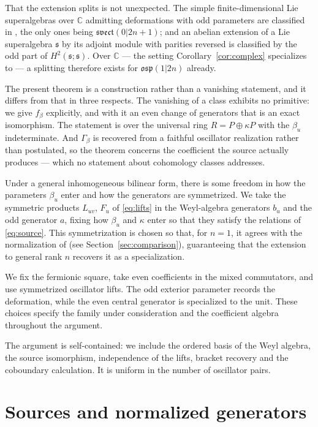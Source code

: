 \documentclass[11pt]{article}
\numberwithin{equation}{section}
\theoremstyle{remark}
\begin{document}
That the extension splits is not unexpected. The simple finite-dimensional Lie
superalgebras over $\mathbb C$ admitting deformations with odd parameters are
classified in \cite[Theorem~7.1]{Lei23}, the only ones being
$\mathfrak{svect}(0|2n+1)$; and an abelian extension of a Lie superalgebra
$\mathfrak s$ by its adjoint module with parities reversed is classified by the
odd part of $H^2(\mathfrak s;\mathfrak s)$. Over $\mathbb C$ --- the setting
Corollary~\ref{cor:complex} specializes to --- a splitting therefore exists for
$\mathfrak{osp}(1|2n)$ already.

The present theorem is a construction rather than a vanishing statement, and it
differs from that in three respects. The vanishing of a class exhibits no
primitive: we give $f_\beta$ explicitly, and with it an even change of
generators that is an exact isomorphism. The statement is over the universal
ring $R=P\oplus\kappa P$ with the $\beta_u$ indeterminate. And
$\Gamma_\beta$ is recovered from a faithful oscillator realization rather than
postulated, so the theorem concerns the coefficient the source actually
produces --- which no statement about cohomology classes addresses.

Under a general inhomogeneous bilinear form, there is some freedom in how the
parameters $\beta_u$ enter and how the generators are symmetrized. We
take the symmetric products $\widehat L_{uv}$, $\widehat F_u$ of
\eqref{eq:lifts} in the Weyl-algebra generators $b_u$ and the odd generator
$a$, fixing how $\beta_u$ and $\kappa$ enter so that they satisfy the
relations of \eqref{eq:source}. This symmetrization is chosen so that, for
$n=1$, it agrees with the normalization of \cite[Section~4]{BS17} (see
Section~\ref{sec:comparison}), guaranteeing that the extension to general
rank $n$ recovers it as a specialization.

We fix the fermionic square, take even coefficients in the mixed commutators,
and use symmetrized oscillator lifts. The odd exterior parameter records the
deformation, while the even central generator is specialized to the unit.
These choices specify the family under consideration and the coefficient
algebra throughout the argument.

The argument is self-contained: we include the ordered basis of the Weyl
algebra, the source isomorphism, independence of the lifts, bracket recovery
and the coboundary calculation. It is uniform in the number of oscillator
pairs.

\section{Sources and normalized generators}\label{sec:sources}
\end{document}
